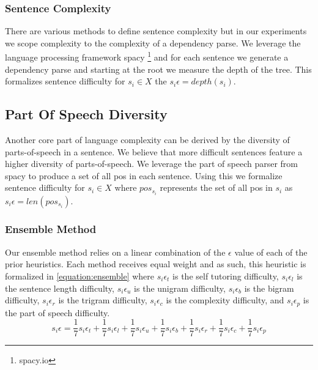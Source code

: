 \subsubsection{Sentence Complexity}
There are various methods to define sentence complexity but in our experiments we scope complexity to the complexity of a dependency parse. We leverage the language processing framework spacy \footnote{spacy.io} and for each sentence we generate a dependency parse and starting at the root we measure the depth of the tree. This formalizes sentence difficulty for  $s_i \in X$ the  $s_i\epsilon = depth(s_i)$.
\subsection{Part Of Speech Diversity}
Another core part of language complexity can be derived by the diversity of parts-of-speech in a sentence. We believe that more difficult sentences feature a higher diversity of parts-of-speech. We leverage the part of speech parser from spacy to produce a set of all pos in each sentence. Using this we formalize sentence difficulty for $s_i \in X$  where $pos_{s_i}$ represents the set of all pos in $s_i$ as $s_i\epsilon = len(pos_{s_i})$.
\subsubsection{Ensemble Method}
Our ensemble method relies on a linear combination of the $\epsilon$ value of each of the prior heuristics. Each method receives equal weight and as such, this heuristic is formalized in \ref{equation:ensemble} where $s_i\epsilon_t$ is the self tutoring difficulty, $s_i\epsilon_l$ is the sentence length difficulty, $s_i\epsilon_u$ is the unigram difficulty, $s_i\epsilon_b$ is the bigram difficulty, $s_i\epsilon_r$ is the trigram difficulty, $s_i\epsilon_c$ is the complexity difficulty, and $s_i\epsilon_p$ is the part of speech difficulty.
\begin{equation}
\label{equation:ensemble}
s_i\epsilon =\frac{1}{7}s_i\epsilon_t +\frac{1}{7}s_i\epsilon_l +\frac{1}{7}s_i\epsilon_u+\frac{1}{7}s_i\epsilon_b +\frac{1}{7}s_i\epsilon_r +\frac{1}{7}s_i\epsilon_c  +\frac{1}{7}s_i\epsilon_p
\end{equation}

